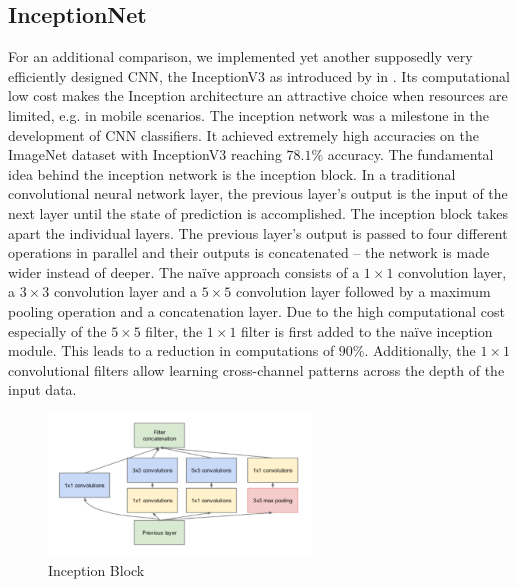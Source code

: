 \subsection{InceptionNet}
For an additional comparison, we implemented yet another supposedly very efficiently designed CNN, the InceptionV3 as introduced by \citeauthor{Szegedy2015} in \citeyear{Szegedy2015}. Its computational low cost makes the Inception architecture an attractive choice when resources are limited, e.g. in mobile scenarios. The inception network was a milestone in the development of CNN classifiers. It achieved extremely high accuracies on the ImageNet dataset with InceptionV3 reaching $78.1\%$ accuracy.
The fundamental idea behind the inception network is the inception block. In a traditional convolutional neural network layer, the previous layer's output is the input of the next layer until the state of prediction is accomplished. The inception block takes apart the individual layers. The previous layer's output is passed to four different operations in parallel and their outputs is concatenated -- the network is made wider instead of deeper. The naïve approach consists of a $1\times1$ convolution layer, a $3\times3$ convolution layer and a $5\times5$ convolution layer followed by a maximum pooling operation and a concatenation layer. Due to the high computational cost especially of the $5\times5$ filter, the $1\times1$ filter is first added to the naïve inception module. This leads to a reduction in computations of $90\%$.
Additionally, the $1\times1$ convolutional filters allow learning cross-channel patterns across the depth of the input data. 

\begin{figure}[htb]
    \centering
    \includegraphics[width=7cm]{images/InceptionNet.jpg}
    \caption{Inception Block}
    \label{fig:incepblock}
\end{figure}